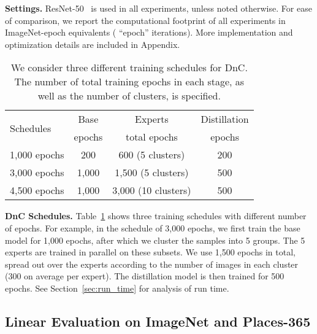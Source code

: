 \documentclass[final]{cvpr}
\begin{document}
\noindent \textbf{Settings.} ResNet-50~\cite{he2016deep} is used in all experiments, unless noted otherwise. For ease of comparison, we report the computational footprint of all experiments in ImageNet-epoch equivalents ( ``epoch''   iterations). More implementation and optimization details are included in Appendix.


\begin{table}[ht]
\caption{We consider three different training schedules for DnC. The number of total training epochs in each stage, as well as the number of clusters, is specified.}

\label{tab:dnc_schedule}
\begin{center}
\begin{small}
\begin{tabular}{l|c|c|c}
\toprule
\multirow{2}{*}{Schedules} & Base & Experts & Distillation \\
& epochs & total epochs & epochs \\
\hline
1,000 epochs & \hspace{1ex} 200 & \hspace{1ex} 600 (5 clusters) & 200 \\
3,000 epochs & 1,000 & 1,500 (5 clusters) & 500 \\
4,500 epochs & 1,000 & \hspace{1ex}3,000 (10 clusters) & 500 \\
\bottomrule
\end{tabular}
\end{small}
\end{center}
\vspace{-10pt}
\end{table}



\noindent \textbf{DnC Schedules.} 
Table~\ref{tab:dnc_schedule} shows three training schedules with different number of epochs. For example, in the schedule of 3,000 epochs, we first train the base model for 1,000 epochs, after which we cluster the samples into 5 groups. The 5 experts are trained in parallel on these subsets. We use 1,500 epochs in total, spread out over the experts according to the number of images in each cluster (300 on average per expert). The distillation model is then trained for 500 epochs. 
See Section~\ref{sec:run_time} for analysis of run time.

\subsection{Linear Evaluation on ImageNet and Places-365}
\end{document}
